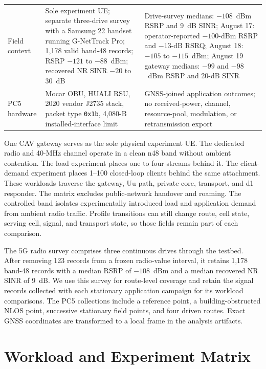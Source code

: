 \begin{table}[t]
\begin{tabular}{@{}p{}p{}p{}@{}}
    Field context & Sole experiment UE; separate three-drive survey with a Samsung 22 handset running G-NetTrack Pro; 1,178 valid band-48 records; RSRP $-121$ to $-88$~dBm; recovered NR SINR $-20$ to 30~dB & Drive-survey medians: $-108$~dBm RSRP and 9~dB SINR; August 17: operator-reported $-100$-dBm RSRP and $-13$-dB RSRQ; August 18: $-105$ to $-115$~dBm; August 19 gateway medians: $-99$ and $-98$~dBm RSRP and 20-dB SINR \\
    PC5 hardware & Mocar OBU, HUALI RSU, 2020 vendor J2735 stack, packet type \texttt{0x1b}, 4,080-B installed-interface limit & GNSS-joined application outcomes; no received-power, channel, resource-pool, modulation, or retransmission export \\
    \bottomrule
  \end{tabular}
\end{table}

One CAV gateway serves as the sole physical experiment UE. The dedicated radio
and 40-MHz channel operate in a clean n48 band without ambient contention. The load experiment
places one to four streams behind it. The client-demand experiment places
1--100 closed-loop clients behind the same attachment. These workloads
traverse the gateway, Uu path, private core, transport, and d1 responder. The
matrix excludes public-network handover and roaming. The controlled band
isolates experimentally introduced load and application demand from ambient
radio traffic.
Profile transitions can still change route, cell state, serving cell, signal,
and transport state, so those fields remain part of each comparison.

The 5G radio survey comprises three continuous drives through the testbed.
After removing 123 records from a frozen radio-value interval, it retains
1,178 band-48 records with a median RSRP of $-108$~dBm and a median recovered
NR SINR of 9~dB. We use this survey for route-level coverage and retain the
signal records collected with each stationary application campaign for its
workload comparisons.
The PC5 collections include a reference point, a building-obstructed NLOS
point, successive stationary field points, and four driven routes. Exact GNSS
coordinates are transformed to a local frame in the analysis artifacts.

\section{Workload and Experiment Matrix}
\label{app:matrix}

